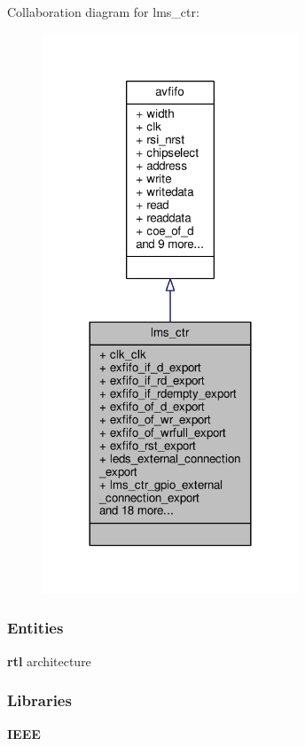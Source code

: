 Collaboration diagram for lms\+\_\+ctr\+:\nopagebreak
\begin{figure}[H]
\begin{center}
\leavevmode
\includegraphics[width=216pt]{d4/d4f/classlms__ctr__coll__graph}
\end{center}
\end{figure}
\subsubsection*{Entities}
\begin{DoxyCompactItemize}
\item 
{\bf rtl} architecture
\end{DoxyCompactItemize}
\subsubsection*{Libraries}
 \begin{DoxyCompactItemize}
\item 
{\bf I\+E\+EE} 
\end{DoxyCompactItemize}
